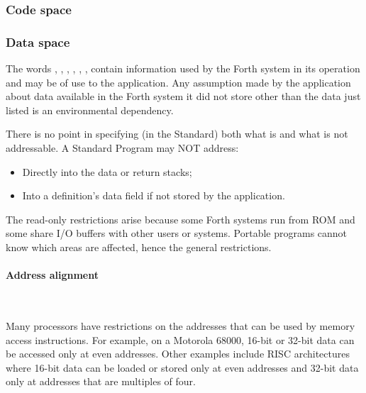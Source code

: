 \subsubsection{Code space} %

\subsubsection{Data space} %
\label{rat:dataspace}

The words , , , ,
, ,   contain information
used by the Forth system in its operation and may be of use to the
application. Any assumption made by the application about data
available in the Forth system it did not store other than the data
just listed is an environmental dependency.

There is no point in specifying (in the Standard) both what is and
what is not addressable. A Standard Program may NOT address:

\begin{itemize}
\item Directly into the data or return stacks;
\item Into a definition's data field if not stored by the application.
\end{itemize}

The read-only restrictions arise because some Forth systems run from
ROM and some share I/O buffers with other users or systems. Portable
programs cannot know which areas are affected, hence the general
restrictions.

\paragraph{Address alignment} ~ %

Many processors have restrictions on the addresses that can be used
by memory access instructions. For example, on a Motorola 68000,
16-bit or 32-bit data can be accessed only at even addresses. Other
examples include RISC architectures where 16-bit data can be loaded
or stored only at even addresses and 32-bit data only at addresses
that are multiples of four.

